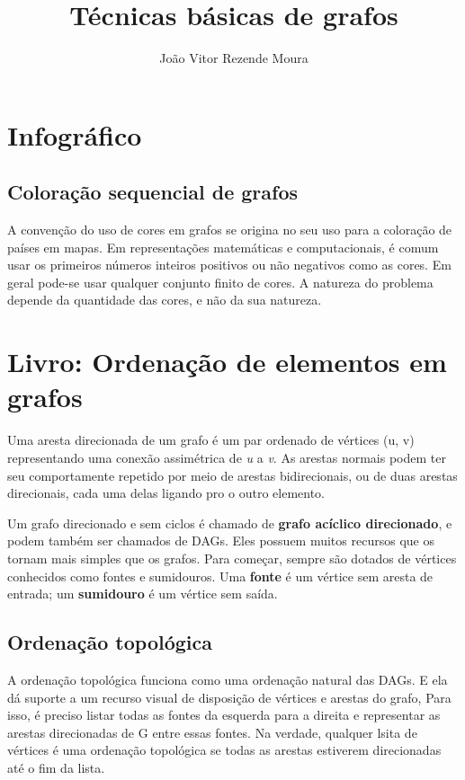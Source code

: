 \documentclass[12pt, a4paper]{paper}
\title{Técnicas básicas de grafos}
\author{João Vitor Rezende Moura}
\begin{document}
\section{Infográfico} %
\label{sec:Infográfico}
\subsection{Coloração sequencial de grafos} %
\label{sub:Coloração sequencial de grafos}
A convenção do uso de cores em grafos se origina no seu uso para a coloração de países 
em mapas. Em representações matemáticas e computacionais, é comum usar os primeiros
números inteiros positivos ou não negativos como as cores. Em geral pode-se usar 
qualquer conjunto finito de cores. A natureza do problema depende da quantidade das 
cores, e não da sua natureza.

\section{Livro: Ordenação de elementos em grafos} %
\label{sec:Livro: Ordenação de elementos em grafos}
Uma aresta direcionada de um grafo é um par ordenado de vértices (u, v) representando
uma conexão assimétrica de \textit{u} a \textit{v}. As arestas normais podem ter seu 
comportamente repetido por meio de arestas bidirecionais, ou de duas arestas direcionais,
cada uma delas ligando pro o outro elemento.

Um grafo direcionado e sem ciclos é chamado de \textbf{grafo acíclico direcionado}, e 
podem também ser chamados de DAGs. Eles possuem muitos recursos que os tornam mais 
simples que os grafos. Para começar, sempre são dotados de vértices conhecidos como 
fontes e sumidouros. Uma \textbf{fonte} é um vértice sem aresta de entrada; um 
\textbf{sumidouro} é um vértice sem saída.

\subsection{Ordenação topológica} %
\label{sub:Ordenação topológica}
A ordenação topológica funciona como uma ordenação natural das DAGs. E ela dá suporte a 
um recurso visual de disposição de vértices e arestas do grafo, Para isso, é preciso 
listar todas as fontes da esquerda para a direita e representar as arestas direcionadas 
de G entre essas fontes. Na verdade, qualquer lsita de vértices é uma ordenação topológica se todas as arestas estiverem direcionadas até o fim da lista.
\end{document}
